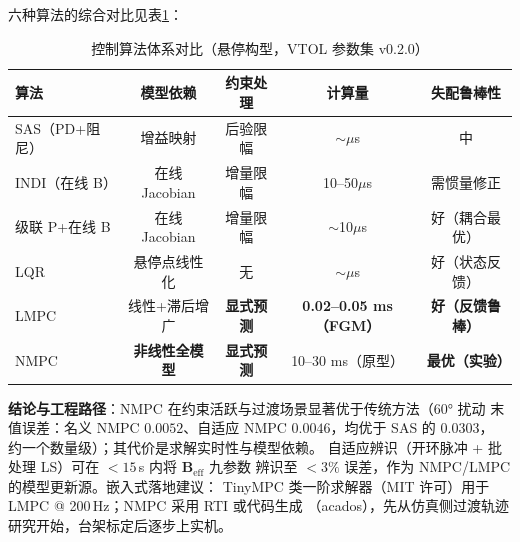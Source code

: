 六种算法的综合对比见表\ref{tab:mpc_algo_compare}：

\begin{table}[H]
\centering
\caption{控制算法体系对比（悬停构型，VTOL 参数集 v0.2.0）}
\label{tab:mpc_algo_compare}
\footnotesize
\setlength{\tabcolsep}{3.5pt}
\begin{tabular}{l c c c c}
\toprule
\textbf{算法} & \textbf{模型依赖} & \textbf{约束处理} & \textbf{计算量} & \textbf{失配鲁棒性} \\
\midrule
SAS（PD+阻尼） & 增益映射 & 后验限幅 & $\sim\mu$s & 中 \\
INDI（在线 B） & 在线 Jacobian & 增量限幅 & 10--50$\mu$s & 需惯量修正 \\
级联 P+在线 B & 在线 Jacobian & 增量限幅 & $\sim$10$\mu$s & 好（耦合最优） \\
LQR & 悬停点线性化 & 无 & $\sim\mu$s & 好（状态反馈） \\
LMPC & 线性+滞后增广 & \textbf{显式预测} & \textbf{0.02--0.05 ms（FGM）} & \textbf{好（反馈鲁棒）} \\
NMPC & \textbf{非线性全模型} & \textbf{显式预测} & 10--30 ms（原型） & \textbf{最优（实验）} \\
\bottomrule
\end{tabular}
\end{table}

\textbf{结论与工程路径}：NMPC 在约束活跃与过渡场景显著优于传统方法（60° 扰动
末值误差：名义 NMPC $0.0052$、自适应 NMPC $0.0046$，均优于 SAS 的 $0.0303$，
约一个数量级）；其代价是求解实时性与模型依赖。
自适应辨识（开环脉冲 + 批处理 LS）可在 $<15$\,s 内将 $\mathbf{B}_{\mathrm{eff}}$ 九参数
辨识至 $<3\%$ 误差，作为 NMPC/LMPC 的模型更新源。嵌入式落地建议：
TinyMPC 类一阶求解器（MIT 许可）用于 LMPC @ 200\,Hz；NMPC 采用 RTI 或代码生成
（acados\cite{verschueren2022acados}），先从仿真侧过渡轨迹研究开始，台架标定后逐步上实机。
